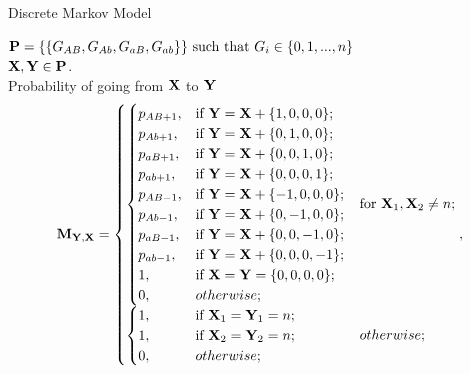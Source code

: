 \documentclass{beamer}
\begin{document}
\begin{frame}{Discrete Markov Model}
\footnotesize

$\bold{P} = \{\{G_{AB},G_{Ab},G_{aB},G_{ab}\}\} \text{ such that } G_i\in\{0,1,...,n\}$\\ 
$\bold{X},\bold{Y} \in \bold{P}$. \\

Probability of going from $\bold{X}$ to $\bold{Y}$
\begin{equation*}
\bold{M}_{\bold{Y},\bold{X}}=
\begin{aligned}
\begin{cases}
\begin{cases}
    p_{AB+1}, & \text{if } \bold{Y} = \bold{X} + \{1,0,0,0\}; \\
    p_{Ab+1}, & \text{if } \bold{Y} = \bold{X} + \{0,1,0,0\};  \\
    p_{aB+1}, & \text{if } \bold{Y} = \bold{X} + \{0,0,1,0\}; \\
    p_{ab+1}, & \text{if } \bold{Y} = \bold{X} + \{0,0,0,1\}; \\
    p_{AB-1}, & \text{if } \bold{Y} = \bold{X} + \{-1,0,0,0\}; \\
    p_{Ab-1}, & \text{if } \bold{Y} = \bold{X} + \{0,-1,0,0\};  \\
    p_{aB-1}, & \text{if } \bold{Y} = \bold{X} + \{0,0,-1,0\}; \\
    p_{ab-1}, & \text{if } \bold{Y} = \bold{X} + \{0,0,0,-1\}; \\
    1, & \text{if}\ \bold{X} = \bold{Y} = \{0,0,0,0\}; \\
    0, & otherwise;
\end{cases}  & \text{for}\ \bold{X}_1, \bold{X}_2 \neq n; \\
\begin{cases} 
    1, & \text{if}\ \bold{X}_1 = \bold{Y}_1 = n; \\
    1, & \text{if}\ \bold{X}_2 = \bold{Y}_2 = n;  \\
    \mathrlap{0,}\hphantom{p_{AB+1},} & otherwise;
\end{cases} & otherwise;
\end{cases},
\end{aligned}
\end{equation*}
\normalsize

\end{frame}
\end{document}
